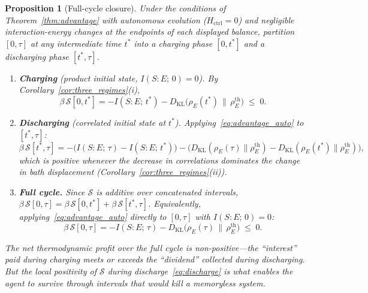 \documentclass[12pt]{article}
\newtheorem{proposition}[theorem]{Proposition}
\begin{document}
\begin{proposition}[Full-cycle closure]
\label{prop:full_cycle}
Under the conditions of
Theorem~\textup{\ref{thm:advantage}} with autonomous evolution
($H_{\mathrm{ctrl}} = 0$) and negligible interaction-energy changes
at the endpoints of each displayed balance, partition $[0,\tau]$ at any
intermediate time $t^*$ into a charging phase $[0,t^*]$ and
a discharging phase $[t^*,\tau]$.
\begin{enumerate}
\item[\textup{(i)}]
  \textbf{Charging} (product initial state, $I(S{:}E;\,0) = 0$).
  By Corollary~\textup{\ref{cor:three_regimes}(i)},
  \begin{equation}
  \label{eq:charge}
  \beta\,\mathcal{S}[0,t^*]
  = -I(S{:}E;\,t^*)
    - D_{\mathrm{KL}}\!\bigl(\rho_E(t^*) \,\big\|\,
      \rho_E^{\mathrm{th}}\bigr)
  \;\leq\; 0.
  \end{equation}
\item[\textup{(ii)}]
  \textbf{Discharging} (correlated initial state at $t^*$).
  Applying~\eqref{eq:advantage_auto} to $[t^*,\tau]$:
  \begin{equation}
  \label{eq:discharge}
  \beta\,\mathcal{S}[t^*,\tau]
  = -\bigl(I(S{:}E;\,\tau) - I(S{:}E;\,t^*)\bigr)
    - \bigl(D_{\mathrm{KL}}(\rho_E(\tau)\|\rho_E^{\mathrm{th}})
      - D_{\mathrm{KL}}(\rho_E(t^*)\|\rho_E^{\mathrm{th}})\bigr),
  \end{equation}
  which is positive whenever the decrease in correlations
  dominates the change in bath displacement
  (Corollary~\textup{\ref{cor:three_regimes}(ii)}).
\item[\textup{(iii)}]
  \textbf{Full cycle.}
  Since $\mathcal{S}$ is additive over concatenated intervals,
  $\beta\,\mathcal{S}[0,\tau]
  = \beta\,\mathcal{S}[0,t^*]
    + \beta\,\mathcal{S}[t^*,\tau]$.
  Equivalently, applying~\eqref{eq:advantage_auto} directly to
  $[0,\tau]$ with $I(S{:}E;\,0) = 0$:
  \begin{equation}
  \label{eq:full_cycle}
  \beta\,\mathcal{S}[0,\tau]
  = -I(S{:}E;\,\tau)
    - D_{\mathrm{KL}}\!\bigl(\rho_E(\tau) \,\big\|\,
      \rho_E^{\mathrm{th}}\bigr)
  \;\leq\; 0.
  \end{equation}
\end{enumerate}
The net thermodynamic profit over the full cycle is
non-positive---the ``interest'' paid during charging
meets or exceeds the ``dividend'' collected during
discharging.
But the \emph{local} positivity of $\mathcal{S}$ during
discharge~\eqref{eq:discharge} is what enables the agent
to survive through intervals that would kill a memoryless
system.
\end{proposition}
\end{document}
